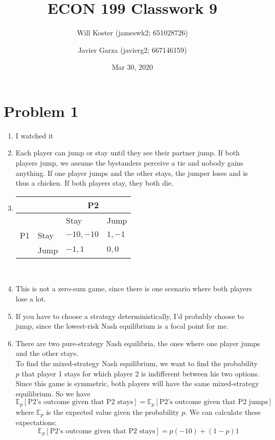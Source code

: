 \documentclass[letterpaper]{article}
\begin{document}
\title{ECON 199 Classwork 9}
\author{Will Koster (jameswk2; 651028726) \and Javier Garza (javierg2; 667146159)}
\date{Mar 30, 2020}
\maketitle

\section{Problem 1}
\begin{enumerate}
    \item I watched it
    \item Each player can jump or stay until they see their partner jump. If both players jump, we assume the bystanders perceive a tie and nobody gains anything. If one player jumps and the other stays, the jumper loses and is thus a chicken. If both players stay, they both die. 
    \item \begin{tabular}{|l|l|l|l|}
            \multicolumn{3}{r}{P2}                      \\ \hline
            \multirow{3}{*}{P1} &   & Stay        & Jump        \\ \hline
            & Stay & $-10,-10$ & $1, -1$ \\ \hline
            & Jump & $-1, 1$ & $0,0$ \\ \hline
        \end{tabular} \\
    \item This is not a zero-sum game, since there is one scenario where both players lose a lot.
    \item If you have to choose a strategy deterministically, I'd probably choose to jump, since the lowest-risk Nash equilibrium is a focal point for me. 
    \item There are two pure-strategy Nash equilibria, the ones where one player jumps and the other stays. \\
        To find the mixed-strategy Nash equilibrium, we want to find the probability $p$ that player 1 stays for which player 2 is indifferent between his two options. Since this game is symmetric, both players will have the same mixed-strategy equilibrium. So we have 
        \[
            \mathbb{E}_p[\text{P2's outcome given that P2 stays}] = \mathbb{E}_p[\text{P2's outcome given that P2 jumps}]
        \]
        where $\mathbb{E}_p$ is the expected value given the probability $p$. We can calculate these expectations: 
        \[
            \mathbb{E}_p[\text{P2's outcome given that P2 stays}] = p(-10) + (1 - p)1
        \]


\end{enumerate}
\end{document}
